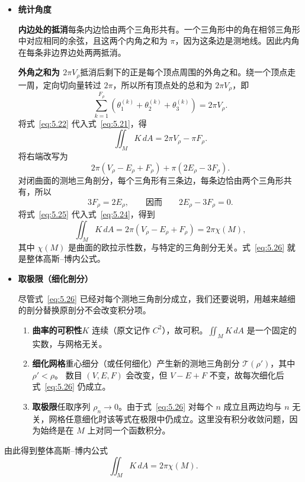 \begin{itemize}
  \item \textbf{统计角度}

  \textbf{内边处的抵消}\quad 每条内边恰由两个三角形共有。一个三角形中的角在相邻三角形中对应相同的余弦，且这两个内角之和为 $\pi$，因为这条边是测地线。因此内角在每条非边界边处两两抵消。

  \textbf{外角之和为 $2\pi V_\rho$}\quad 抵消后剩下的正是每个顶点周围的外角之和。绕一个顶点走一周，定向切向量转过 $2\pi$，所以所有顶点处的总和为 $2\pi V_\rho$，即
  \begin{equation*}
    \sum_{k=1}^{F_\rho}(\theta_1^{(k)}+\theta_2^{(k)}+\theta_3^{(k)})
       =2\pi V_\rho.
    \tag{5.22}\label{eq:5.22}
  \end{equation*}
  将式~\eqref{eq:5.22} 代入式~\eqref{eq:5.21}，得
  \begin{equation*}
    \iint_M K\,dA=2\pi V_\rho-\pi F_\rho.
    \tag{5.23}\label{eq:5.23}
  \end{equation*}
  将右端改写为
  \begin{equation*}
    2\pi(V_\rho-E_\rho+F_\rho)+\pi(2E_\rho-3F_\rho).
    \tag{5.24}\label{eq:5.24}
  \end{equation*}
  对闭曲面的测地三角剖分，每个三角形有三条边，每条边恰由两个三角形共有，所以
  \begin{equation*}
    3F_\rho=2E_\rho,\qquad\text{因而}\qquad 2E_\rho-3F_\rho=0.
    \tag{5.25}\label{eq:5.25}
  \end{equation*}
  将式~\eqref{eq:5.25} 代入式~\eqref{eq:5.24}，得到
  \begin{equation*}
    \iint_M K\,dA=2\pi(V_\rho-E_\rho+F_\rho)=2\pi\chi(M),
    \tag{5.26}\label{eq:5.26}
  \end{equation*}
  其中 $\chi(M)$ 是曲面的欧拉示性数，与特定的三角剖分无关。式~\eqref{eq:5.26} 就是整体高斯–博内公式。
  \item \textbf{取极限（细化剖分）}

  尽管式~\eqref{eq:5.26} 已经对每个测地三角剖分成立，我们还要说明，用越来越细的剖分替换原剖分不会改变积分项。
  \begin{enumerate}[label=\arabic*.]
    \item \textbf{曲率的可积性}\quad $K$ 连续（原文记作 $C^2$），故可积。$\iint_M K\,dA$ 是一个固定的实数，与网格无关。
    \item \textbf{细化网格}\quad 重心细分（或任何细化）产生新的测地三角剖分 $\mathcal T(\rho')$，其中 $\rho'<\rho$。
    数目 $(V,E,F)$ 会改变，但 $V-E+F$ 不变，故每次细化后式~\eqref{eq:5.26} 仍成立。
    \item \textbf{取极限}\quad 任取序列 $\rho_n\to0$。由于式~\eqref{eq:5.26} 对每个 $n$ 成立且两边均与 $n$ 无关，网格任意细化时该等式在极限中仍成立。这里没有积分收敛问题，因为始终是在 $M$ 上对同一个函数积分。
  \end{enumerate}
\end{itemize}
由此得到整体高斯–博内公式
\[
  \iint_M K\,dA=2\pi\chi(M).
\]

